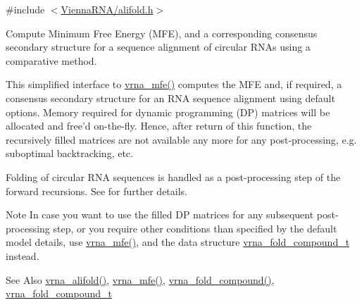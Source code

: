 {\ttfamily \#include $<$\hyperlink{alifold_8h}{Vienna\-R\-N\-A/alifold.\-h}$>$}



Compute Minimum Free Energy (M\-F\-E), and a corresponding consensus secondary structure for a sequence alignment of circular R\-N\-As using a comparative method. 

This simplified interface to \hyperlink{group__mfe__fold_gabd3b147371ccf25c577f88bbbaf159fd}{vrna\-\_\-mfe()} computes the M\-F\-E and, if required, a consensus secondary structure for an R\-N\-A sequence alignment using default options. Memory required for dynamic programming (D\-P) matrices will be allocated and free'd on-\/the-\/fly. Hence, after return of this function, the recursively filled matrices are not available any more for any post-\/processing, e.\-g. suboptimal backtracking, etc.

Folding of circular R\-N\-A sequences is handled as a post-\/processing step of the forward recursions. See \cite{hofacker:2006} for further details.

\begin{DoxyNote}{Note}
In case you want to use the filled D\-P matrices for any subsequent post-\/processing step, or you require other conditions than specified by the default model details, use \hyperlink{group__mfe__fold_gabd3b147371ccf25c577f88bbbaf159fd}{vrna\-\_\-mfe()}, and the data structure \hyperlink{group__fold__compound_ga1b0cef17fd40466cef5968eaeeff6166}{vrna\-\_\-fold\-\_\-compound\-\_\-t} instead.
\end{DoxyNote}
\begin{DoxySeeAlso}{See Also}
\hyperlink{group__consensus__mfe__fold_ga02098d0c8790f9a37fbef6ad0cfc705c}{vrna\-\_\-alifold()}, \hyperlink{group__mfe__fold_gabd3b147371ccf25c577f88bbbaf159fd}{vrna\-\_\-mfe()}, \hyperlink{group__fold__compound_ga6601d994ba32b11511b36f68b08403be}{vrna\-\_\-fold\-\_\-compound()}, \hyperlink{group__fold__compound_ga1b0cef17fd40466cef5968eaeeff6166}{vrna\-\_\-fold\-\_\-compound\-\_\-t}
\end{DoxySeeAlso}

